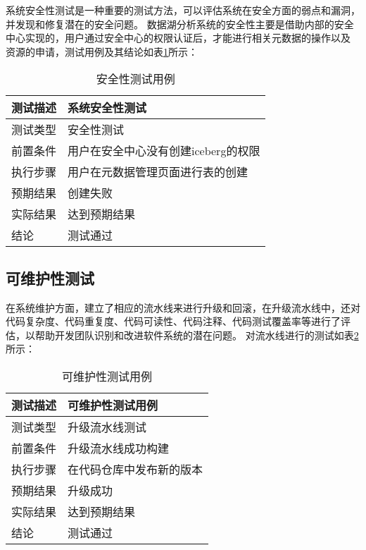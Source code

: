 系统安全性测试是一种重要的测试方法，可以评估系统在安全方面的弱点和漏洞，并发现和修复潜在的安全问题。
数据湖分析系统的安全性主要是借助内部的安全中心实现的，用户通过安全中心的权限认证后，才能进行相关元数据的操作以及
资源的申请，测试用例及其结论如表\ref{tab:安全性测试用例}所示：

\begin{table}[H]
  \centering
  \caption{安全性测试用例}
  \label{tab:安全性测试用例}
  \begin{tabular}{ll}
    \toprule
    测试描述         & 系统安全性测试         \\
    \midrule
    测试类型         & 安全性测试         \\
    前置条件         & 用户在安全中心没有创建iceberg的权限       \\
    执行步骤         & 用户在元数据管理页面进行表的创建\\
    预期结果         & 创建失败  \\
    实际结果         & 达到预期结果           \\
    结论            & 测试通过           \\
    \bottomrule
  \end{tabular}
\end{table}

\subsection{可维护性测试}

在系统维护方面，建立了相应的流水线来进行升级和回滚，在升级流水线中，还对
代码复杂度、代码重复度、代码可读性、代码注释、代码测试覆盖率等进行了评估，以帮助开发团队识别和改进软件系统的潜在问题。
对流水线进行的测试如表\ref{tab:可维护性测试用例}所示：

\begin{table}[H]
  \centering
  \caption{可维护性测试用例}
  \label{tab:可维护性测试用例}
  \begin{tabular}{ll}
    \toprule
    测试描述         & 可维护性测试用例         \\
    \midrule
    测试类型         & 升级流水线测试         \\
    前置条件         & 升级流水线成功构建       \\
    执行步骤         & 在代码仓库中发布新的版本\\
    预期结果         & 升级成功  \\
    实际结果         & 达到预期结果           \\
    结论            & 测试通过           \\
    \bottomrule
  \end{tabular}
\end{table}

